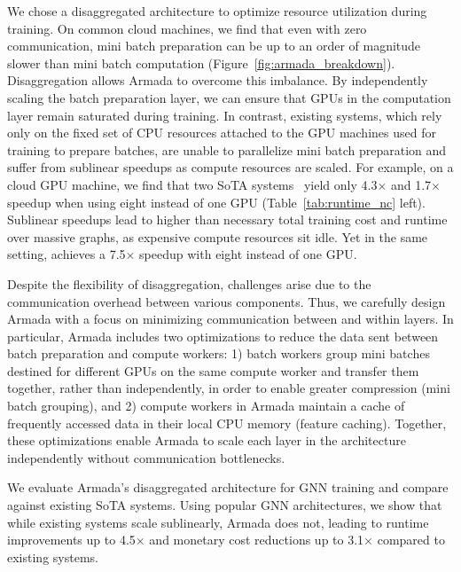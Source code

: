 We chose a disaggregated architecture to optimize resource utilization during training. On common cloud machines, we find that even with zero communication, mini batch preparation can be up to an order of magnitude slower than mini batch computation (Figure~\ref{fig:armada_breakdown}). Disaggregation allows Armada to overcome this imbalance. By independently scaling the batch preparation layer, we can ensure that GPUs in the computation layer remain saturated during training. In contrast, existing systems, which rely only on the fixed set of CPU resources attached to the GPU machines used for training to prepare batches, are unable to parallelize mini batch preparation and suffer from sublinear speedups as compute resources are scaled. For example, on a cloud GPU machine, we find that two SoTA systems~\cite{salient++, distDGL} yield only 4.3$\times$ and 1.7$\times$ speedup when using eight instead of one GPU (Table~\ref{tab:runtime_nc} left). Sublinear speedups lead to higher than necessary total training cost and runtime over massive graphs, as expensive compute resources sit idle. Yet in the same setting, \systemname achieves a 7.5$\times$ speedup with eight instead of one GPU.

Despite the flexibility of disaggregation, challenges arise due to the communication overhead between various components. Thus, we carefully design Armada with a focus on minimizing communication between and within layers. In particular, Armada includes two optimizations to reduce the data sent between batch preparation and compute workers: 1) batch workers group mini batches destined for different GPUs on the same compute worker and transfer them together, rather than independently, in order to enable greater compression (mini batch grouping), and 2) compute workers in Armada maintain a cache of frequently accessed data in their local CPU memory (feature caching). Together, these optimizations enable Armada to scale each layer in the architecture independently without communication bottlenecks.

We evaluate Armada's disaggregated architecture for GNN training and compare against existing SoTA systems. Using popular GNN architectures, we show that while existing systems scale sublinearly, Armada does not, leading to runtime improvements up to 4.5$\times$ and monetary cost reductions up to 3.1$\times$ compared to existing systems.
